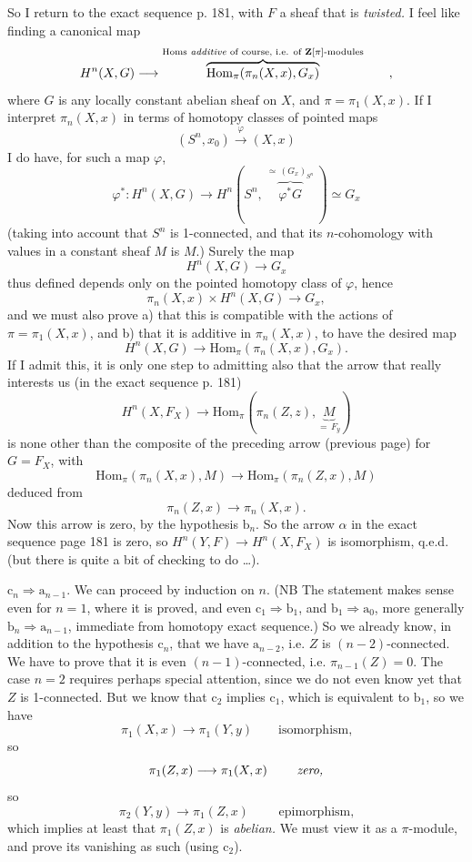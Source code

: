 So I return to the exact sequence p. 181, with $F$ a sheaf that is \textit{twisted.} I feel like finding a canonical map
\[
H^n(X,G) \longrightarrow \overbrace{\mathrm{Hom}_\pi(\pi_n(X,x),G_x)}^{\text{\scriptsize Homs \textit{additive} of course, i.e. of $\mathbf{Z}[\pi]$-modules}} \qquad ,
\]
where $G$ is any locally constant abelian sheaf on $X$, and $\pi = \pi_1(X,x)$. If I interpret
$\pi_n(X,x)$ in terms of homotopy classes of pointed maps
\[
(S^n,x_0) \xrightarrow{\ \varphi\ } (X,x)
\]
I do have, for such a map $\varphi$,
\[
\varphi^* : H^n(X,G) \longrightarrow H^n(S^n,\ \overbrace{\varphi^*G}^{\simeq\,(G_x)_{S^n}}\ ) \simeq G_x
\]
(taking into account that $S^n$ is 1-connected, and that its $n$-cohomology with values in a constant sheaf $M$ is $M$.) Surely the map
\[
H^n(X,G) \longrightarrow G_x
\]
thus defined depends only on the pointed homotopy class of $\varphi$, hence
\[
\pi_n(X,x) \times H^n(X,G) \longrightarrow G_x,
\]
and we must also prove a) that this is compatible with the actions of $\pi = \pi_1(X,x)$, and b) that it is additive in $\pi_n(X,x)$, to have the desired map
\[
H^n(X,G) \longrightarrow \mathrm{Hom}_\pi(\pi_n(X,x),G_x).
\]
If I admit this, it is only one step to admitting also that the arrow that really interests us (in the exact sequence p. 181)
\[
H^n(X,F_X) \longrightarrow \mathrm{Hom}_\pi(\pi_n(Z,z),\underbrace{M}_{=\,F_y})
\]
is none other than the composite of the preceding arrow (previous page) for $G = F_X$, with
\[
\mathrm{Hom}_\pi(\pi_n(X,x),M) \longrightarrow \mathrm{Hom}_\pi(\pi_n(Z,x),M)
\]
deduced from
\[
\pi_n(Z,x) \longrightarrow \pi_n(X,x).
\]
Now this arrow is zero, by the hypothesis $\mathrm{b}_n$. So the arrow $\alpha$ in the exact sequence page 181 is zero, so $H^n(Y,F) \longrightarrow H^n(X,F_X)$ is isomorphism, q.e.d. (but there is quite a bit of checking to do \dots).

$\mathrm{c}_n \Longrightarrow \mathrm{a}_{n-1}$. We can proceed by induction on $n$. (NB The statement makes sense even for $n=1$, where it is proved, and even $\mathrm{c}_1 \Longrightarrow \mathrm{b}_1$, and $\mathrm{b}_1 \Longrightarrow \mathrm{a}_0$, more generally $\mathrm{b}_n \Longrightarrow \mathrm{a}_{n-1}$, immediate from homotopy exact sequence.) So we already know, in addition to the hypothesis $\mathrm{c}_n$, that we have $\mathrm{a}_{n-2}$, i.e. $Z$ is $(n-2)$-connected. We have to prove that it is even $(n-1)$-connected, i.e. $\pi_{n-1}(Z)=0$. The case $n=2$ requires %
perhaps special attention, since we do not even know yet that $Z$ is 1-connected. But we know that $\mathrm{c}_2$ implies $\mathrm{c}_1$, which is equivalent to $\mathrm{b}_1$, so we have
\[
\pi_1(X,x) \longrightarrow \pi_1(Y,y) \qquad \text{isomorphism,}
\]
so
\[
\pi_1(Z,x) \longrightarrow \pi_1(X,x) \qquad \text{ \textit{zero,}}
\]
so
\[
\pi_2(Y,y) \longrightarrow \pi_1(Z,x) \qquad \text{ epimorphism,}
\]
which implies at least that $\pi_1(Z,x)$ is \textit{abelian.} We must view it as a $\pi$-module, and prove its vanishing as such (using $\mathrm{c}_2$).

